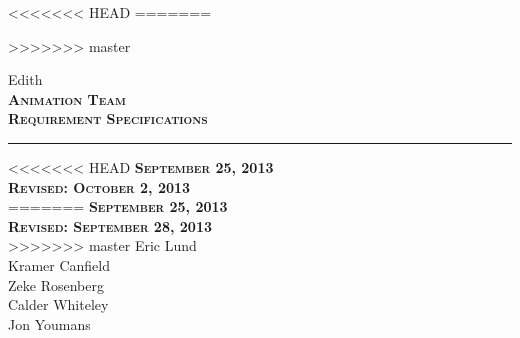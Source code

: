 \documentclass[12pt]{article}
\begin{document}
<<<<<<< HEAD
=======



>>>>>>> master
\begin{titlepage}
	\begin{center}
	\huge  Edith \\
	\vspace*{\fill}%
 	\huge \textsc{\textbf{Animation Team \\Requirement Specifications} }	
	\bigskip 
	\rule{130mm}{.1pt}
<<<<<<< HEAD
	\textsc{\textbf{September 25, 2013 \\ Revised: October 2, 2013} \\ }	
=======
	\textsc{\textbf{September 25, 2013 \\ Revised: September 28, 2013} \\ }	
>>>>>>> master
	\vspace*{\fill}%
	Eric Lund \\
	Kramer Canfield \\ 
	Zeke Rosenberg \\
	Calder Whiteley \\
	Jon Youmans
	\end{center}
	\end{titlepage}


\end{document}
